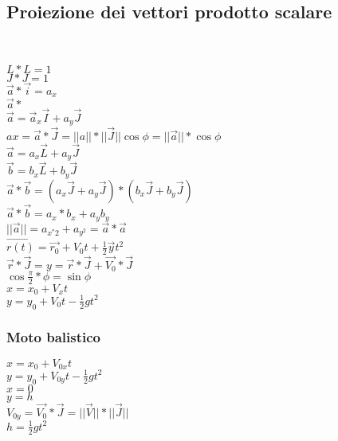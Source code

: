 \documentclass{book}
\begin{document}
\subsection{Proiezione dei vettori prodotto scalare}
\\
\begin{multicols}{3} 
$L*L=1$\\
$J*J=1$\\
$\overrightarrow{a}*\overrightarrow{i}=a_x$\\
$\overrightarrow{a}*$\\
$\overrightarrow{a}=\overrightarrow{a}_x\overrightarrow{I}+a_y\overrightarrow{J}$\\
$ax=\overrightarrow{a}*\overrightarrow{J}=||a||*||\overrightarrow{J}||\cos{\phi}=||\overrightarrow{a}||*\cos{\phi}$\\
$\overrightarrow{a}=a_x\overrightarrow{L}+a_y\overrightarrow{J}$\\
$\overrightarrow{b}=b_x\overrightarrow{L}+b_y\overrightarrow{J}$\\
$\overrightarrow{a}*\overrightarrow{b}=(a_x\overrightarrow{J}+a_y\overrightarrow{J})*(b_x\overrightarrow{J}+b_y\overrightarrow{J})$\\
$\overrightarrow{a}*\overrightarrow{b}=a_x*b_x+a_yb_y$\\
$||\overrightarrow{a}||=a_{x^*2}+a_{y^2}=\overrightarrow{a}*\overrightarrow{a}$\\
$\overrightarrow{r(t)}=\overrightarrow{r_0}+V_0t+\frac{1}{2}\overrightarrow{y}t^2$\\
$\overrightarrow{r}*\overrightarrow{J}=y=\overrightarrow{r}*\overrightarrow{J}+\overrightarrow{V_0}*\overrightarrow{J}$\\
$\cos{\frac{\pi}{2}*\phi}=\sin{\phi}$\\
$x=x_0+V_xt$\\
$y=y_0+V_0t-\frac{1}{2}gt^2$\\
\end{multicols} 
\subsubsection{Moto balistico}
$x=x_0+V_{0x}t$\\
$y=y_0+V_{0y}t-\frac{1}{2}gt^2$\\
$x=0$\\
$y=h$\\
$V_{0y}=\overrightarrow{V_0}*\overrightarrow{J}=||\overrightarrow{V}||*||\overrightarrow{J}||$\\
$h=\frac{1}{2}gt^2$
\end{document}
